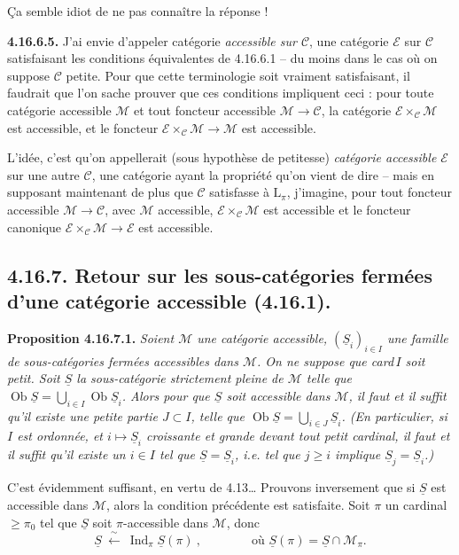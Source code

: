 \documentclass[11pt]{article}
\newcommand{\printedpage}[1]{\marginpar{\footnotesize p.~#1}}
\newcommand{\msp}[1]{\marginpar{\footnotesize [#1]}}
\newcommand{\cE}{\mathcal{E}}
\newcommand{\cC}{\mathcal{C}}
\newcommand{\cM}{\mathcal{M}}
\newcommand{\Ob}{\operatorname{Ob}}
\newcommand{\Ind}{\operatorname{Ind}}
\newcommand{\uS}{\underline{S}}
\begin{document}
Ça semble idiot de ne pas connaître la réponse !

\textbf{4.16.6.5.} J'ai envie d'appeler catégorie \textit{accessible sur $\cC$}, une catégorie $\cE$ sur $\cC$ satisfaisant les conditions équivalentes de 4.16.6.1 -- du moins dans le cas où on suppose $\cC$ petite. Pour que cette terminologie soit vraiment satisfaisant, il faudrait que l'on sache prouver que ces conditions impliquent ceci : pour toute catégorie accessible $\cM$ et tout foncteur accessible $\cM \longrightarrow \cC$, la catégorie $\cE \times_{\cC} \cM$ est accessible, et le foncteur $\cE \times_{\cC} \cM \longrightarrow \cM$ est accessible. %

\msp{page 476bis}
L'idée, c'est qu'on appellerait (sous hypothèse de petitesse) \textit{catégorie accessible $\cE$} sur une autre $\cC$, une catégorie ayant la propriété qu'on vient de dire -- mais en supposant maintenant de plus que $\cC$ satisfasse à $\mathrm{L}_\pi$, j'imagine, pour tout foncteur accessible $\cM \longrightarrow \cC$, avec $\cM$ accessible, $\cE \times_{\cC} \cM$ est accessible et le foncteur canonique $\cE \times_{\cC} \cM \longrightarrow \cE$ est accessible.

\msp{page 477}
\subsection*{4.16.7. Retour sur les sous-catégories fermées d'une catégorie accessible (4.16.1).}

\textbf{Proposition 4.16.7.1.} \textit{Soient $\cM$ une catégorie accessible, $(\uS_i)_{i\in I}$ une famille de sous-catégories fermées accessibles dans $\cM$. On ne suppose que \textup{card}\,$I$ soit petit. Soit $\uS$ la sous-catégorie strictement pleine de $\cM$ telle que $\Ob \uS = \bigcup_{i\in I} \Ob \uS_i$. Alors pour que $\uS$ %
\printedpage{185}
soit accessible dans $\cM$, il faut et il suffit qu'il existe une \textup{petite} partie $J \subset I$, telle que $\Ob \uS = \bigcup_{i\in J} \uS_i$. (En particulier, si $I$ est ordonnée, et $i \longmapsto \uS_i$ croissante et grande devant tout petit cardinal, il faut et il suffit qu'il existe un $i \in I$ tel que $\uS = \uS_i$, i.e. tel que $j \geqslant i$ implique $\uS_j = \uS_i$.)}

C'est évidemment suffisant, en vertu de 4.13\dots{} Prouvons inversement que si $\uS$ est accessible dans $\cM$, alors la condition précédente est satisfaite. Soit $\pi$ un cardinal $\geqslant \pi_0$ tel que $\uS$ soit $\pi$-accessible dans $\cM$, donc
\[
\uS \ \xleftarrow{\ \sim\ }\ \Ind_\pi \uS(\pi) \ , \qquad\qquad \text{où } \uS(\pi) = \uS \cap \cM_\pi.
\]
\end{document}
